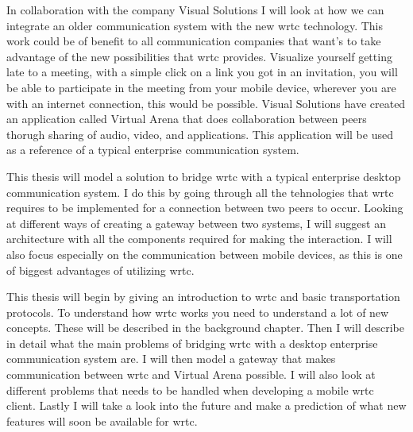 In collaboration with the company Visual Solutions I will look at how we can integrate an older communication system with the new \gls{wrtc} technology. This work could be of benefit to all communication companies that want's to take advantage of the new possibilities that \gls{wrtc} provides. Visualize yourself getting late to a meeting, with a simple click on a link you got in an invitation, you will be able to participate in the meeting from your mobile device, wherever you are with an internet connection, this would be possible. Visual Solutions have created an application called Virtual Arena that does collaboration between peers thorugh sharing of audio, video, and applications. This application will be used as a reference of a typical enterprise communication system.

This thesis will model a solution to bridge \gls{wrtc} with a typical enterprise desktop communication system. I do this by going through all the tehnologies that \gls{wrtc} requires to be implemented for a connection between two peers to occur. Looking at different ways of creating a gateway between two systems, I will suggest an architecture with all the components required for making the interaction. I will also focus especially on the communication between mobile devices, as this is one of biggest advantages of utilizing \gls{wrtc}.

This thesis will begin by giving an introduction to \gls{wrtc} and basic transportation protocols. To understand how \gls{wrtc} works you need to understand a lot of new concepts. These will be described in the background chapter. Then I will describe in detail what the main problems of bridging \gls{wrtc} with a desktop enterprise communication system are. I will then model a gateway that makes communication between \gls{wrtc} and Virtual Arena possible. I will also look at different problems that needs to be handled when developing a mobile \gls{wrtc} client. Lastly I will take a look into the future and make a prediction of what new features will soon be available for \gls{wrtc}.